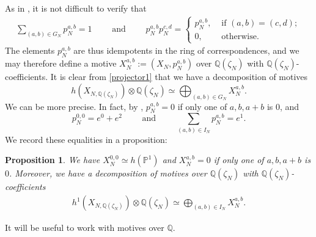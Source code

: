 \documentclass[11pt,a4,leqno]{amsart}
\theoremstyle{my theoremstyle}
\newtheorem{prop}[thm]{Proposition}
\theoremstyle{dfn}
\theoremstyle{remark}
\renewcommand{\1}{\mathbbm{1}}
\newcommand{\Q}{\mathbb{Q}}
\newcommand{\z}{\zeta}
\numberwithin{equation}{section}
\begin{document}
    As in \cite[(2.5)]{Ots11}, it is not difficult to verify that 
\begin{align} \label{projector1}
\sum_{(a, b) \in G_N} p_N^{a, b}=1 \qquad \text{ and } \qquad p_N^{a, b} p_N^{c, d}= 
 \left\{
\begin{array}{ll}
p_N^{a, b},& \text{ if } (a, b)=(c, d) ;\\
0, & \text{ otherwise.} 
\end{array}
\right.
\end{align}
The elements $p_N^{a,b}$ are thus idempotents in the ring of correspondences, and we may therefore define a motive $X_N^{a, b}:=(X_N, p_N^{a, b})$ over $\Q(\z_N)$ with $\Q(\zeta_N)$-coefficients. It is clear from \eqref{projector1} that we have a decomposition of motives 
\[
h(X_{N, \Q(\z_N)}) \otimes \Q(\zeta_N)\simeq \bigoplus_{(a, b) \in G_N} X_N^{a, b}.
\]
We can be more precise. In fact, by \cite[Propositon 2.9]{Ots11}, $p_N^{a,b}=0$ if only one of $a,b, a+b$ is $0$, and 
\begin{equation*}
    p_N^{0,0}=e^0 + e^2 \qquad \text{ and } \qquad \sum_{(a,b)\in I_N} p_N^{a,b}=e^1.
\end{equation*}
We record these equalities in a proposition:

\begin{prop}\label{lem:mot_decomp}
    We have $X_N^{0,0} \simeq h(\mathbb{P}^1)$ and $X_N^{a,b}=0$ if only one of $a,b, a+b$ is $0$. Moreover, we have a decomposition of motives over $\Q(\z_N)$ with $\Q(\zeta_N)$-coefficients
\begin{align*}
h^1(X_{N, \Q(\z_N)}) \otimes \Q(\z_N) \simeq \bigoplus_{(a, b) \in I_N} X_N^{a, b}.
\end{align*}
\end{prop}

It will be useful to work with motives over $\Q$. 
\end{document}
